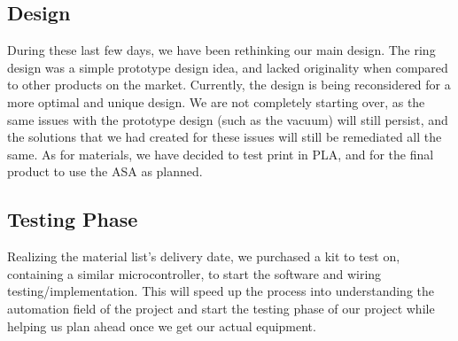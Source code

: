  
\subsection{Design}
During these last few days, we have been rethinking our main design. The ring design was a simple prototype design idea, and lacked originality when compared to other products on the market. Currently, the design is being reconsidered for a more optimal and unique design. We are not completely starting over, as the same issues with the prototype design (such as the vacuum) will still persist, and the solutions that we had created for these issues will still be remediated all the same. As for materials, we have decided to test print in PLA, and for the final product to use the ASA as planned. \par

\subsection{Testing Phase}
Realizing the material list's delivery date, we purchased a kit to test on, containing a similar microcontroller, to start the software and wiring testing/implementation. This will speed up the process into understanding the automation field of the project and start the testing phase of our project while helping us plan ahead once we get our actual equipment. \par